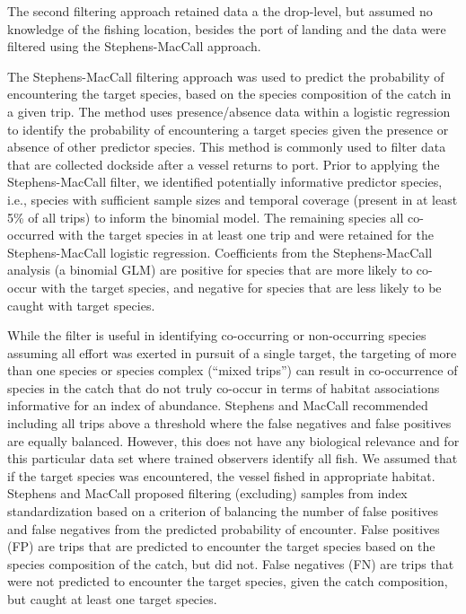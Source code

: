 \documentclass[
  authoryear,
  preprint,
  3p]{elsarticle}
\begin{document}
The second filtering approach retained data a the drop-level, but
assumed no knowledge of the fishing location, besides the port of
landing and the data were filtered using the Stephens-MacCall approach.

The Stephens-MacCall \citeyearpar{Stephens:2004:MAS} filtering approach
was used to predict the probability of encountering the target species,
based on the species composition of the catch in a given trip. The
method uses presence/absence data within a logistic regression to
identify the probability of encountering a target species given the
presence or absence of other predictor species. This method is commonly
used to filter data that are collected dockside after a vessel returns
to port. Prior to applying the Stephens-MacCall filter, we identified
potentially informative predictor species, i.e., species with sufficient
sample sizes and temporal coverage (present in at least 5\% of all
trips) to inform the binomial model. The remaining species all
co-occurred with the target species in at least one trip and were
retained for the Stephens-MacCall logistic regression. Coefficients from
the Stephens-MacCall analysis (a binomial GLM) are positive for species
that are more likely to co-occur with the target species, and negative
for species that are less likely to be caught with target species.

While the filter is useful in identifying co-occurring or non-occurring
species assuming all effort was exerted in pursuit of a single target,
the targeting of more than one species or species complex (``mixed
trips'') can result in co-occurrence of species in the catch that do not
truly co-occur in terms of habitat associations informative for an index
of abundance. Stephens and MacCall \citeyearpar{Stephens:2004:MAS}
recommended including all trips above a threshold where the false
negatives and false positives are equally balanced. However, this does
not have any biological relevance and for this particular data set where
trained observers identify all fish. We assumed that if the target
species was encountered, the vessel fished in appropriate habitat.
Stephens and MacCall \citeyearpar{Stephens:2004:MAS} proposed filtering
(excluding) samples from index standardization based on a criterion of
balancing the number of false positives and false negatives from the
predicted probability of encounter. False positives (FP) are trips that
are predicted to encounter the target species based on the species
composition of the catch, but did not. False negatives (FN) are trips
that were not predicted to encounter the target species, given the catch
composition, but caught at least one target species.
\end{document}

